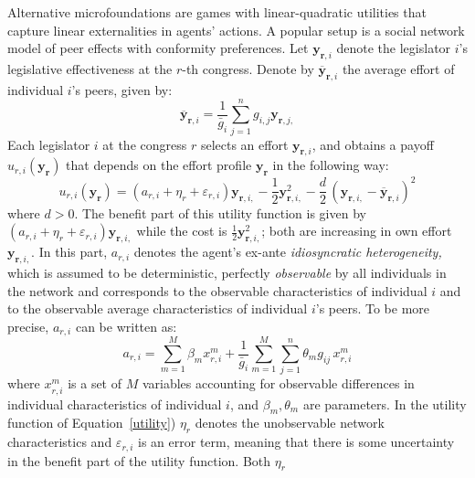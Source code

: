 \documentclass[nojss]{jss}
\begin{document}
Alternative microfoundations are games with linear-quadratic utilities that
capture linear externalities in agents' actions.  A popular setup is a
social network model of peer effects with conformity preferences.  Let
$\mathbf{y}_{\mathbf{r}, i}$ denote the legislator $i$'s legislative
effectiveness at the $r$-th congress.  Denote by
$\overline{\mathbf{y}}_{\mathbf{r}, i}$ the average effort of individual
$i$'s peers, given by:%
%
\begin{equation*}
\overline{\mathbf{y}}_{\mathbf{r}, i}=\frac{1}{\bar g_{i}}\sum_{j=1}^{n}g_{i, j}\mathbf{y}_{\mathbf{r}, j,}
\label{aver}
\end{equation*}%
%
Each legislator $i$ at the congress $r$ selects an effort
$\mathbf{y}_{\mathbf{r}, i}$, and obtains a payoff $u_{r,
i}(\mathbf{y}_{\mathbf{r}})$ that depends on the effort profile
$\mathbf{y}_{\mathbf{r}}$ in the following way:%
%
\begin{equation}
u_{r, i}(\mathbf{y}_{\mathbf{r}})=\left( a_{r, i}+\eta _{r}+\varepsilon _{r,
i}\right) \mathbf{y}_{\mathbf{r}, i,}- \frac{1}{2}\mathbf{y}_{\mathbf{r},
i,}^{2}-\frac{d}{2}\,(\mathbf{y}_{\mathbf{r},
i,}-\overline{\mathbf{y}}_{\mathbf{r}, i})^{2}
\label{utility}
\end{equation}%
%
where $d>0$.  The benefit part of this utility function is given by $\left(
a_{r, i}+\eta _{r}+\varepsilon _{r, i}\right)\mathbf{y}_{\mathbf{r}, i,}$
while the cost is $\frac{1}{2}\mathbf{y}_{\mathbf{r}, i,}^{2}$; both are
increasing in own effort $\mathbf{y}_{\mathbf{r}, i,}$.  In this part,
$a_{r, i}$ denotes the agent's ex-ante \textsl{idiosyncratic heterogeneity,}
which is assumed to be deterministic, perfectly \textsl{ observable} by all
individuals in the network and corresponds to the observable characteristics
of individual $i$ and to the observable average characteristics of
individual $i$'s peers.  To be more precise, $a_{r,i}$ can be written as:
%
\begin{equation*}
a_{r, i}=\sum_{m=1}^{M}\beta _{m}x_{r, i}^{m}+\frac{1}{\bar g_{i}}%
\sum_{m=1}^{M}\sum_{j=1}^{n}\theta _{m}g_{ij}\,x_{r, i}^{m}  \label{MUI}
\end{equation*}%
%
where $x_{r, i}^{m}$ is a set of $M$ variables accounting for observable
differences in individual characteristics of individual $i$, and $\beta
_{m},\theta _{m}$ are parameters.  In the utility function of Equation~\ref{utility})
$\eta _{r}$ denotes the unobservable network characteristics and
$\varepsilon _{r, i}$ is an error term, meaning that there is some
uncertainty in the benefit part of the utility function.  Both $\eta _{r}$
\end{document}
